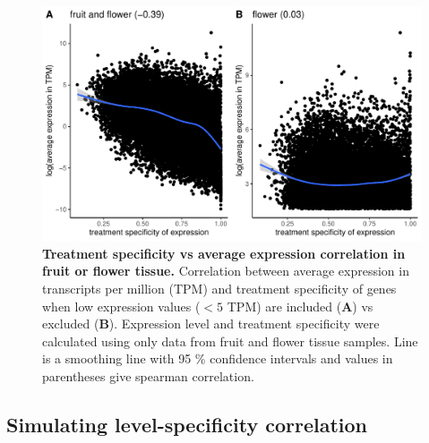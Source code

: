 \documentclass[12pt]{article}
\begin{document}
\begin{figure}[H]
\centering
\includegraphics[width = \linewidth]{figures/appendix_a/flower_treatmentSpecificityVsAverageExpression_withVsWithoutZeros.pdf}
\caption{\textbf{Treatment specificity vs average expression correlation in fruit or flower tissue.} Correlation between average expression in transcripts per million (TPM) and treatment specificity of genes when low expression values ($< 5$ TPM) are included (\textbf{A}) vs excluded (\textbf{B}). Expression level and treatment specificity were calculated using only data from fruit and flower tissue samples. Line is a smoothing line with 95 \% confidence intervals and values in parentheses give spearman correlation.}%
\end{figure}

\subsection*{Simulating level-specificity correlation}
\end{document}
